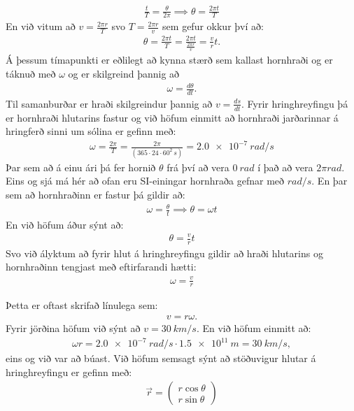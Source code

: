 \ifdefined \wholebook \else\documentclass[oneside]{book}\usepackage{EdlBook}\graphicspath{{figures/}}
\begin{document}
\begin{align*}
    \frac{t}{T} = \frac{\theta}{2\pi} \implies \theta = \frac{2\pi t}{T}
\end{align*}
En við vitum að $v = \frac{2\pi r}{T}$ svo $T = \frac{2\pi r}{v}$ sem gefur okkur því að:
\begin{align*}
    \theta = \frac{2\pi t}{T} = \frac{2\pi t}{\frac{2\pi r}{v}} = \frac{v}{r}t.
\end{align*}
Á þessum tímapunkti er eðlilegt að kynna stærð sem kallast hornhraði og er táknuð með $\omega$ og er skilgreind þannig að
\begin{align*}
    \omega = \frac{d\theta}{dt}.
\end{align*}
Til samanburðar er hraði skilgreindur þannig að $v = \frac{ds}{dt}$. Fyrir hringhreyfingu þá er hornhraði hlutarins fastur og við höfum einmitt að hornhraði jarðarinnar á hringferð sinni um sólina er gefinn með:
\begin{align*}
    \omega = \frac{2\pi}{T} = \frac{2\pi}{(365 \cdot 24 \cdot 60^2 \, \si{s})} = \SI{2.0e-7}{rad/s}
\end{align*}
Þar sem að á einu ári þá fer hornið $\theta$ frá því að vera $\SI{0}{rad}$ í það að vera $2\pi \si{rad}$. Eins og sjá má hér að ofan eru SI-einingar hornhraða gefnar með $\si{rad/s}$. En þar sem að hornhraðinn er fastur þá gildir að:
\begin{align*}
    \omega = \frac{\theta}{t} \implies \theta = \omega t
\end{align*}
En við höfum áður sýnt að:
\begin{align*}
    \theta = \frac{v}{r}t
\end{align*}
Svo við ályktum að fyrir hlut á hringhreyfingu gildir að hraði hlutarins og hornhraðinn tengjast með eftirfarandi hætti:
\begin{align*}
    \omega = \frac{v}{r}
\end{align*}

Þetta er oftast skrifað línulega sem:
\begin{align*}
    v  = r\omega.
\end{align*}
Fyrir jörðina höfum við sýnt að $v = \SI{30}{km/s}$. En við höfum einmitt að:
\begin{align*}
    \omega r = \SI{2.0e-7}{rad/s} \cdot \SI{1.5e11}{m} = \SI{30}{km/s},
\end{align*}
eins og við var að búast. Við höfum semsagt sýnt að stöðuvigur hlutar á hringhreyfingu er gefinn með:
\begin{align*}
    \vec{r} = \begin{pmatrix} r\cos\theta \\ r\sin\theta \end{pmatrix}
\end{align*}
\end{document}
